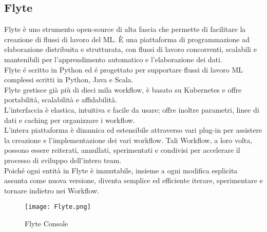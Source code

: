\documentclass[../tesi.tex]{subfiles}
\begin{document}
\subsection{Flyte}
  Flyte è uno strumento open-source di alta fascia che permette di facilitare la creazione di flussi di lavoro del ML. È una piattaforma di programmazione ad elaborazione distribuita e strutturata, con flussi di lavoro concorrenti, scalabili e mantenibili per l’apprendimento automatico e l’elaborazione dei dati.\\
  Flyte é scritto in Python ed é progettato per supportare flussi di lavoro ML complessi scritti in Python, Java e Scala.\\
  Flyte gestisce già più di dieci mila workflow, è basato su \Gls{Kubernetes} e offre portabilità, scalabilità e affidabilità.\\
  L’interfaccia è elastica, intuitiva e facile da usare; offre inoltre parametri, linee di dati e caching per organizzare i workflow.\\
  L’intera piattaforma è dinamica ed estensibile attraverso vari plug-in per assistere la creazione e l’implementazione dei vari workflow. Tali Workflow, a loro volta, possono essere reiterati, annullati, sperimentati e condivisi per accelerare il processo di sviluppo dell’intero team.\\
  Poiché ogni entità in Flyte è immutabile, insieme a ogni modifica esplicita assunta come nuova versione, diventa semplice ed efficiente iterare, sperimentare e tornare indietro nei Workflow.
\begin{figure}[htbp]
  \centering
  \texttt{[image: Flyte.png]} 
  \caption{Flyte Console}
  \end{figure}

\newpage
\end{document}
